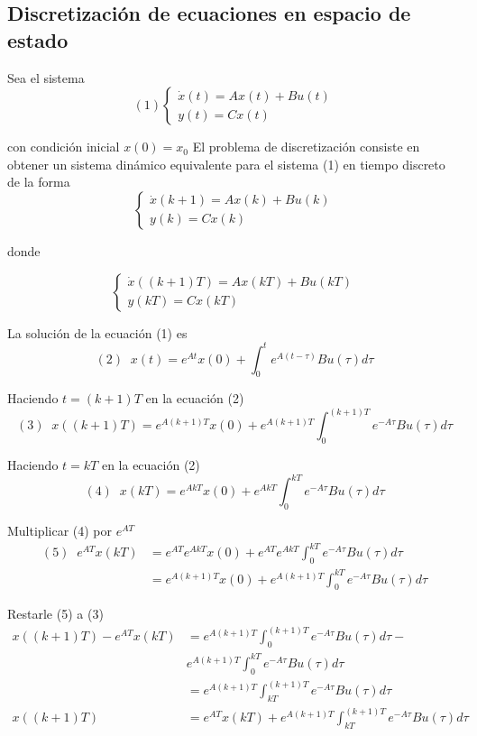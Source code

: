 \subsection{Discretización de ecuaciones en espacio de estado}

Sea el sistema
\[
    (1)
    \left\{
        \begin{array}{lll}
            \dot{x}(t) = Ax(t) + Bu(t)\\
            y(t) = Cx(t)
        \end{array}
    \right.
\]

con condición inicial \( x(0) = x_{0} \)
El problema de discretización consiste en obtener un sistema dinámico equivalente para el sistema (1) en tiempo discreto de la forma
\[
    \left\{
        \begin{array}{lll}
            \dot{x}(k+1) = Ax(k) + Bu(k) \\
            y(k) = Cx(k)
        \end{array}
    \right.
\]

donde

\[
    \left\{
        \begin{array}{lll}
            \dot{x}((k+1)T) = Ax(kT) + Bu(kT) \\
            y(kT) = Cx(kT)
        \end{array}
    \right.
\]

La solución de la ecuación (1) es 
\[
    (2) \;\; x(t) = e^{At}x(0) + \int_{0}^{t}e^{A(t-\tau)}Bu(\tau)d\tau
\]

Haciendo \( t = (k+1)T \) en la ecuación (2)
\[
    (3) \;\; x((k+1)T) = e^{A(k+1)T}x(0) + e^{A(k+1)T} \int_{0}^{(k+1)T} e^{-A\tau}Bu(\tau)d\tau
\]

Haciendo \( t = kT \) en la ecuación (2)
\[
    (4) \;\; x(kT) = e^{AkT}x(0) + e^{AkT}\int_{0}^{kT} e^{-A\tau}Bu(\tau)d\tau
\]

Multiplicar (4) por \( e^{AT} \)
\[
    \begin{split}
        (5) \;\; e^{AT}x(kT) & = e^{AT}e^{AkT}x(0) + e^{AT}e^{AkT}\int_{0}^{kT} e^{-A\tau}Bu(\tau)d\tau \\
        & = e^{A(k+1)T}x(0) + e^{A(k+1)T}\int_{0}^{kT} e^{-A\tau}Bu(\tau)d\tau
    \end{split}
\]

Restarle (5) a (3)
\[
    \begin{split}
        x((k+1)T) - e^{AT}x(kT) & = e^{A(k+1)T} \int_{0}^{(k+1)T} e^{-A \tau}Bu(\tau)d\tau - \\ 
        & e^{A(k+1)T}\int_{0}^{kT}e^{-A \tau}Bu(\tau)d\tau \\
        & = e^{A(k+1)T}\int_{kT}^{(k+1)T}e^{-A \tau}Bu(\tau)d\tau \\
        x((k+1)T) & = e^{AT}x(kT) + e^{A(k+1)T}\int_{kT}^{(k+1)T}e^{-A \tau}Bu(\tau)d\tau 
    \end{split}
\]

